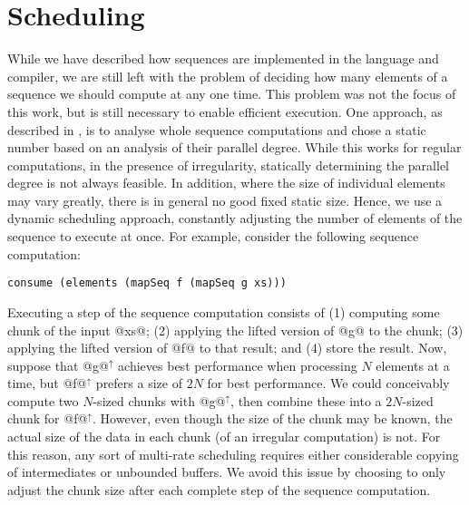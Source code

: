 \section{Scheduling}
\label{sec:scheduling}

While we have described how sequences are implemented in the language and compiler, we are still left with the problem of deciding how many elements of a sequence we should compute at any one time. This problem was not the focus of this work, but is still necessary to enable efficient execution. One approach, as described in \citet{Madsen:2015}, is to analyse whole sequence computations and chose a static number based on an analysis of their parallel
degree. While this works for regular computations, in the presence of
irregularity, statically determining the parallel degree is not always feasible. In addition, where the size of individual elements may vary greatly, there is
in general no good fixed static size. Hence, we use a dynamic scheduling
approach, constantly adjusting the number of elements of the sequence to execute
at once.
For example, consider the following sequence computation:
%
\begin{lstlisting}
consume (elements (mapSeq f (mapSeq g xs)))
\end{lstlisting}
%
Executing a step of the sequence computation consists of (1) computing some
chunk of the input @xs@; (2) applying the lifted version of @g@ to the chunk; (3) applying the lifted version of @f@ to that result; and (4) store the result. Now, suppose that @g@$^\uparrow$ achieves best performance when processing $N$ elements at a
time, but @f@$^\uparrow$ prefers a size of $2N$ for best performance. We could
conceivably compute two $N$-sized chunks with @g@$^\uparrow$, then combine these
into a $2N$-sized chunk for @f@$^\uparrow$. However, even though the size of the
chunk may be known, the actual size of the data in each chunk (of an irregular
computation) is not. For this reason, any sort of multi-rate scheduling requires
either considerable copying of intermediates or unbounded buffers. We avoid this
issue by choosing to only adjust the chunk size after each complete step of the
sequence computation.

